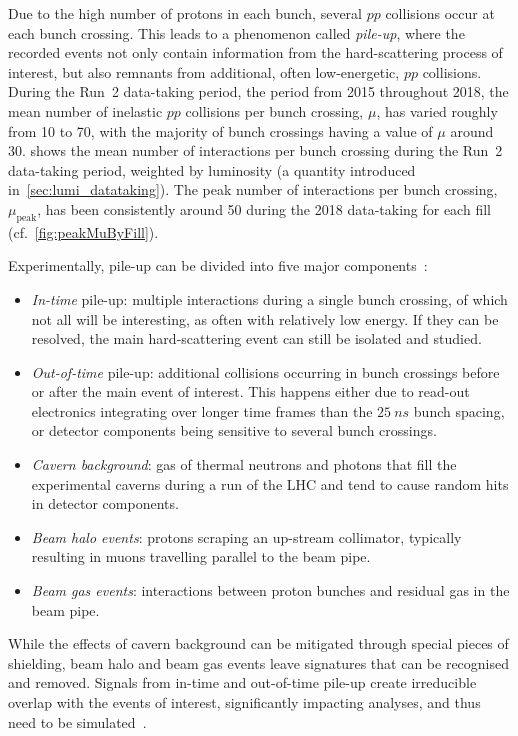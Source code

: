 Due to the high number of protons in each bunch, several $pp$ collisions occur at each bunch crossing.
This leads to a phenomenon called \textit{pile-up}, where the recorded events not only contain information from the hard-scattering process of interest, but also remnants from additional, often low-energetic, $pp$ collisions.
During the Run~2 data-taking period, \ie the period from 2015 throughout 2018, the mean number of inelastic $pp$ collisions per bunch crossing, $\mu$, has varied roughly from 10 to 70, with the majority of bunch crossings having a value of $\mu$ around 30.
 shows the mean number of interactions per bunch crossing during the Run~2 data-taking period, weighted by luminosity (a quantity introduced in~\cref{sec:lumi_datataking}).
The peak number of interactions per bunch crossing, $\mu_\mathrm{peak}$, has been consistently around 50 during the 2018 data-taking for each fill (cf.~\cref{fig:peakMuByFill}).

Experimentally, pile-up can be divided into five major components~\cite{Marshall:2014mza}:
\begin{itemize}
	\item \textit{In-time} pile-up: multiple interactions during a single bunch crossing, of which not all will be interesting, as often with relatively low energy. If they can be resolved, the main hard-scattering event can still be isolated and studied.
	\item \textit{Out-of-time} pile-up: additional collisions occurring in bunch crossings before or after the main event of interest. This happens either due to read-out electronics integrating over longer time frames than the $\SI{25}{ns}$ bunch spacing, or detector components being sensitive to several bunch crossings.
	\item \textit{Cavern background}: gas of thermal neutrons and photons that fill the experimental caverns during a run of the LHC and tend to cause random hits in detector components.
	\item \textit{Beam halo events}: protons scraping an up-stream collimator, typically resulting in muons travelling parallel to the beam pipe.
	\item \textit{Beam gas events}: interactions between proton bunches and residual gas in the beam pipe.
\end{itemize}
While the effects of cavern background can be mitigated through special pieces of shielding, beam halo and beam gas events leave signatures that can be recognised and removed. Signals from in-time and out-of-time pile-up create irreducible overlap with the events of interest, significantly impacting analyses, and thus need to be simulated~\cite{Marshall:2014mza}.

